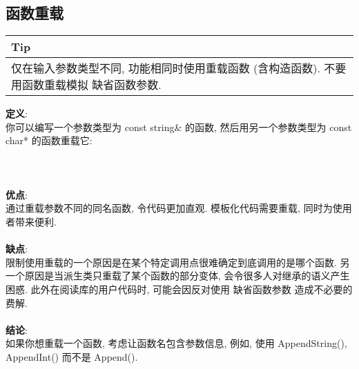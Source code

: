 \documentclass[a4paper,11pt,CJK]{article}
\begin{document}
\begin{CJK}{UTF8}{gbsn}
\subsection{函数重载}
\begin{table}[htbp]
\flushleft
\begin{tabular}{p{400pt}}
\toprule
\rowcolor[gray]{.8} Tip \\
\midrule
仅在输入参数类型不同, 功能相同时使用重载函数 (含构造函数). 不要用函数重载模拟 缺省函数参数.\\
\bottomrule
\end{tabular}
\end{table}
\noindent
\textbf{定义}:\\
\indent 你可以编写一个参数类型为 const string\& 的函数, 然后用另一个参数类型为 const char* 的函数重载它:\\
\\
\\
\\
\textbf{优点}:\\
\indent 通过重载参数不同的同名函数, 令代码更加直观. 模板化代码需要重载, 同时为使用者带来便利.\\
\\
\textbf{缺点}:\\
\indent 限制使用重载的一个原因是在某个特定调用点很难确定到底调用的是哪个函数. 另一个原因是当派生类只重载了某个函数的部分变体, 会令很多人对继承的语义产生困惑. 此外在阅读库的用户代码时, 可能会因反对使用 缺省函数参数 造成不必要的费解.\\
\\
\textbf{结论}:\\
\indent 如果你想重载一个函数, 考虑让函数名包含参数信息, 例如, 使用 AppendString(), AppendInt() 而不是 Append().


\end{CJK}
\end{document}
